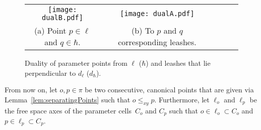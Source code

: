 \documentclass[a4paper,11pt]{article}
\begin{document}
\begin{figure}[ht]
  \begin{center}
    \begin{tabular}{ccccccc}
      \texttt{[image: dualB.pdf]} & &
       \texttt{[image: dualA.pdf]}&&\\ 
{\small (a) Point $p \in \ell$ and $q \in \hbar$.} & &
      {\small (b) To $p$ and $q$ corresponding leashes.}&&
    \end{tabular}
  \end{center}
  \vspace*{-12pt}
  \caption{Duality of parameter points from $\ell$ ($\hbar$) and leashes that lie perpendicular to $d_{\ell}$ ($d_{\hbar}$).}
  \label{fig:dual}
\end{figure}

	From now on, let $o,p \in \pi$ be two consecutive, canonical points that are given via Lemma~\ref{lem:separatingPoints} such that $o \leq_{xy} p$. Furthermore, let $\ell_o$ and $\ell_p$ be the free space axes of the parameter cells~$C_o$ and $C_p$ such that $o \in \ell_o \subset C_o$ and $p \in \ell_p \subset C_p$.
	
\end{document}
